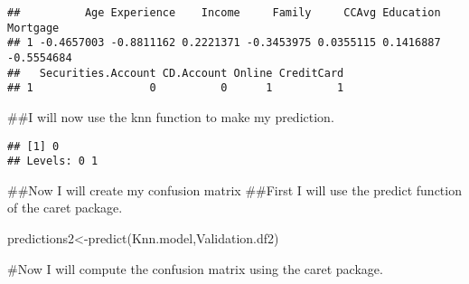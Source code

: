 \documentclass[
]{article}
\newenvironment{Shaded}{\begin{snugshade}}{\end{snugshade}}
\newcommand{\AttributeTok}[1]{\textcolor[rgb]{0.77,0.63,0.00}{#1}}
\newcommand{\DecValTok}[1]{\textcolor[rgb]{0.00,0.00,0.81}{#1}}
\newcommand{\FunctionTok}[1]{\textcolor[rgb]{0.00,0.00,0.00}{#1}}
\newcommand{\NormalTok}[1]{#1}
\newcommand{\OtherTok}[1]{\textcolor[rgb]{0.56,0.35,0.01}{#1}}
\newcommand{\SpecialCharTok}[1]{\textcolor[rgb]{0.00,0.00,0.00}{#1}}
\begin{document}
\begin{verbatim}
##          Age Experience    Income     Family     CCAvg Education   Mortgage
## 1 -0.4657003 -0.8811162 0.2221371 -0.3453975 0.0355115 0.1416887 -0.5554684
##   Securities.Account CD.Account Online CreditCard
## 1                  0          0      1          1
\end{verbatim}

\#\#I will now use the knn function to make my prediction.

\begin{Shaded}
\end{Shaded}

\begin{verbatim}
## [1] 0
## Levels: 0 1
\end{verbatim}

\#\#Now I will create my confusion matrix \#\#First I will use the
predict function of the caret package.

\begin{Shaded}
\begin{Highlighting}[]
\NormalTok{predictions2}\OtherTok{\textless{}{-}}\FunctionTok{predict}\NormalTok{(Knn.model,Validation.df2)}
\end{Highlighting}
\end{Shaded}

\#Now I will compute the confusion matrix using the caret package.

\begin{Shaded}
\end{Shaded}
\end{document}
